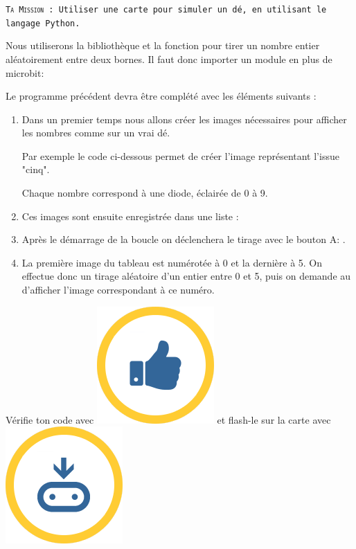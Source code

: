 \begin{eleve}    
    \texttt{\textsc{Ta Mission} : Utiliser une carte
    \mb  pour simuler un dé, en utilisant le langage Python.}

Nous utiliserons la bibliothèque  et la fonction  pour tirer un nombre entier aléatoirement entre deux bornes. Il faut donc importer un module en plus de microbit:
     
Le programme précédent devra être complété avec les éléments suivants :

    \begin{enumerate}
    \item Dans un premier temps nous allons créer les images nécessaires pour afficher les nombres comme sur un vrai dé.
    
    Par exemple le code ci-dessous permet de créer l'image représentant l'issue "cinq".
    
    Chaque nombre correspond à une diode, éclairée de 0 à 9.
    
    \item Ces images sont ensuite enregistrée dans une liste :
    
    \item Après le démarrage de la boucle  on déclenchera le tirage avec le bouton A:  .
    
    \item La première image du tableau  est numérotée à 0 et la dernière à 5.
    On effectue donc un tirage aléatoire d'un entier entre 0 et 5, puis on demande au \mb d'afficher l'image correspondant à ce numéro.
    
    
    \end{enumerate}
    
    Vérifie ton code avec   \includegraphics[width=0.05\linewidth]{res/check.png} et flash-le sur la carte avec \includegraphics[width=0.05\linewidth]{res/flash.png}

    

\end{eleve}



